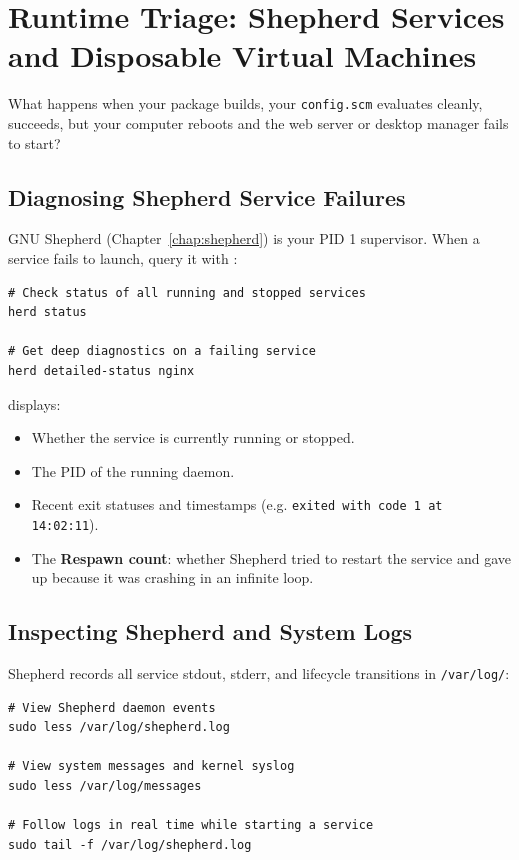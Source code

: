 \section{Runtime Triage: Shepherd Services and Disposable Virtual Machines}

What happens when your package builds, your \texttt{config.scm} evaluates cleanly,  succeeds, but your computer reboots and the web server or desktop manager fails to start?

\subsection{Diagnosing Shepherd Service Failures}

GNU Shepherd (Chapter~\ref{chap:shepherd}) is your PID 1 supervisor. When a service fails to launch, query it with :

\begin{lstlisting}[style=guixcli]
# Check status of all running and stopped services
herd status

# Get deep diagnostics on a failing service
herd detailed-status nginx
\end{lstlisting}

 displays:
\begin{itemize}
  \item Whether the service is currently running or stopped.
  \item The PID of the running daemon.
  \item Recent exit statuses and timestamps (e.g. \texttt{exited with code 1 at 14:02:11}).
  \item The \textbf{Respawn count}: whether Shepherd tried to restart the service and gave up because it was crashing in an infinite loop.
\end{itemize}

\subsection{Inspecting Shepherd and System Logs}

Shepherd records all service stdout, stderr, and lifecycle transitions in \texttt{/var/log/}:

\begin{lstlisting}[style=guixcli]
# View Shepherd daemon events
sudo less /var/log/shepherd.log

# View system messages and kernel syslog
sudo less /var/log/messages

# Follow logs in real time while starting a service
sudo tail -f /var/log/shepherd.log
\end{lstlisting}


